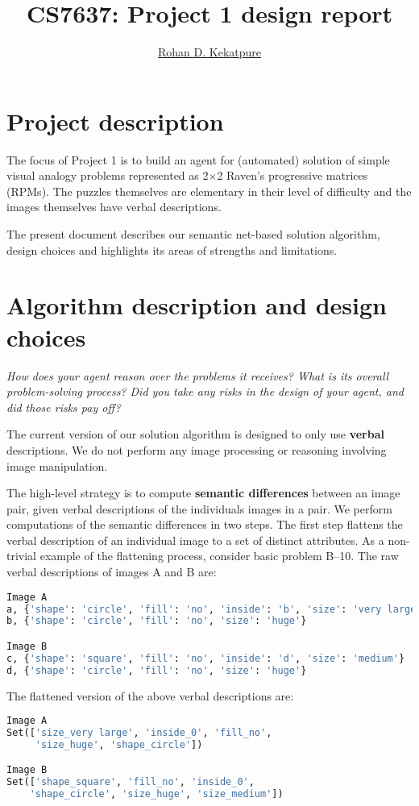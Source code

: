 \documentclass[10pt,letterpaper]{article}
\newcommand{\mypar}{\par{\vspace{0.2cm}}}
\newcommand{\rubric}[1]{\mypar{}\textcolor{mygray}{\emph{#1}}\mypar{}}
\begin{document}
\title{\Large{CS7637: Project 1 design report}}
\author{\href{mailto:rohan.kekatpure@gmail.com}{Rohan D. Kekatpure}}
\address{}
\email{}

\section{Project description}
The focus of Project 1 is to build an agent for (automated) solution of simple visual analogy problems represented as 2$\times$2 Raven's progressive matrices (RPMs). The puzzles themselves are elementary in their level of difficulty and the images themselves have verbal descriptions. 

The present document describes our semantic net-based solution algorithm, design choices and highlights its areas of strengths and limitations. 

\section{Algorithm description and design choices}
\rubric {How does your agent reason over the problems it receives? What is its overall problem-solving process? Did you take any risks in the design of your agent, and did those risks pay off?}
The current version of our solution algorithm is designed to only use {\bf verbal} descriptions. We do not perform any image processing or reasoning involving image manipulation. 

The high-level strategy is to compute {\bf semantic differences} between an image pair, given verbal descriptions of the individuals images in a pair. We perform computations of the semantic differences in two steps. The first step flattens the verbal description of an individual image to a set of distinct attributes. As a non-trivial example of the flattening process, consider basic problem B--10. The raw verbal descriptions of images A and B are:
\begin{small}
\begin{lstlisting}[language=python]
Image A
a, {'shape': 'circle', 'fill': 'no', 'inside': 'b', 'size': 'very large'}
b, {'shape': 'circle', 'fill': 'no', 'size': 'huge'}

Image B
c, {'shape': 'square', 'fill': 'no', 'inside': 'd', 'size': 'medium'}
d, {'shape': 'circle', 'fill': 'no', 'size': 'huge'}
\end{lstlisting}
\end{small}
The flattened version of the above verbal descriptions are:
\begin{small}
\begin{lstlisting}[language=python]
Image A
Set(['size_very large', 'inside_0', 'fill_no', 
     'size_huge', 'shape_circle'])

Image B
Set(['shape_square', 'fill_no', 'inside_0', 
    'shape_circle', 'size_huge', 'size_medium'])
\end{lstlisting}
\end{small}
\end{document}
